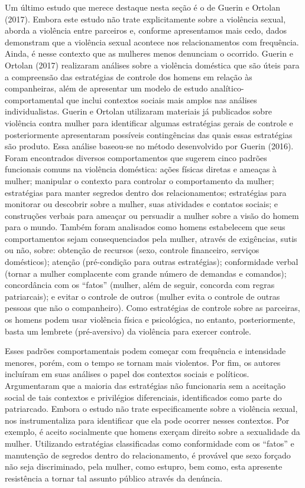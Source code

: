 Um último estudo que merece destaque nesta seção é o de Guerin e Ortolan (2017). Embora este estudo não trate explicitamente sobre a violência sexual, aborda a violência entre parceiros e, conforme apresentamos mais cedo, dados demonstram que a violência sexual acontece nos relacionamentos com frequência. Ainda, é nesse contexto que as mulheres menos denunciam o ocorrido. Guerin e Ortolan (2017) realizaram análises sobre a violência doméstica que são úteis para a compreensão das estratégias de controle dos homens em relação às companheiras, além de apresentar um modelo de estudo analítico-comportamental que inclui contextos sociais mais amplos nas análises individualistas. Guerin e Ortolan utilizaram materiais já publicados sobre violência contra mulher para identificar algumas estratégias gerais de controle e posteriormente apresentaram possíveis contingências das quais essas estratégias são produto. Essa análise baseou-se no método desenvolvido por Guerin (2016). Foram encontrados diversos comportamentos que sugerem cinco padrões funcionais comuns na violência doméstica: ações físicas diretas e ameaças à mulher; manipular o contexto para controlar o comportamento da mulher; estratégias para manter segredos dentro dos relacionamentos; estratégias para monitorar ou descobrir sobre a mulher, suas atividades e contatos sociais; e construções verbais para ameaçar ou persuadir a mulher sobre a visão do homem para o mundo. Também foram analisados como homens estabelecem que seus comportamentos sejam consequenciados pela mulher, através de exigências, sutis ou não, sobre: obtenção de recursos (sexo, controle financeiro, serviços domésticos); atenção (pré-condição para outras estratégias); conformidade verbal (tornar a mulher complacente com grande número de demandas e comandos); concordância com os ``fatos'' (mulher, além de seguir, concorda com regras patriarcais); e evitar o controle de outros (mulher evita o controle de outras pessoas que não o companheiro). Como estratégias de controle sobre as parceiras, os homens podem usar violência física e psicológica, no entanto, posteriormente, basta um lembrete (pré-aversivo) da violência para exercer controle.

Esses padrões comportamentais podem começar com frequência e intensidade menores, porém, com o tempo se tornam mais violentos. Por fim, os autores incluíram em suas análises o papel dos contextos sociais e políticos. Argumentaram que a maioria das estratégias não funcionaria sem a aceitação social de tais contextos e privilégios diferenciais, identificados como parte do patriarcado. Embora o estudo não trate especificamente sobre a violência sexual, nos instrumentaliza para identificar que ela pode ocorrer nesses contextos. Por exemplo, é aceito socialmente que homens exerçam direito sobre a sexualidade da mulher. Utilizando estratégias classificadas como conformidade com os ``fatos'' e manutenção de segredos dentro do relacionamento, é provável que sexo forçado não seja discriminado, pela mulher, como estupro, bem como, esta apresente resistência a tornar tal assunto público através da denúncia. 


